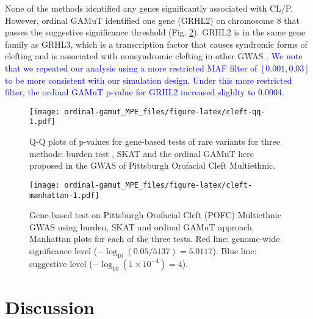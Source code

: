 \documentclass[]{article}
\begin{document}
None of the methods identified any genes significantly associated with CL/P. However, ordinal GAMuT
identified one gene (GRHL2) on chromosome 8 that passes the suggestive significance threshold (Fig. \ref{fig:cleft-manhattan}). GRHL2 is in the same gene family as GRHL3, which is a transcription factor that causes syndromic forms of clefting and is associated with nonsyndromic clefting in other GWAS \citep{Leslie2016, Leslie2016b, Carpinelli2017, PeyrardJanvid2014}. \textcolor{blue}{We note that we repeated our analysis using a more restricted MAF filter of $[0.001,0.03]$ to be more consistent with our simulation design. Under this more restricted filter, the ordinal GAMuT p-value for GRHL2 increased slighlty to 0.0004.}

\begin{figure}
\centering
\texttt{[image: ordinal-gamut\_MPE\_files/figure-latex/cleft-qq-1.pdf]}
\caption{\label{fig:cleft-qq}Q-Q plots of p-values for gene-based tests of rare variants for three methods: burden test \citep{Li2008, Madsen2009}, SKAT \citep{Wu2011} and the ordinal GAMuT here proposed in the GWAS of Pittsburgh Orofacial Cleft Multiethnic.}
\end{figure}

\begin{figure}
\centering
\texttt{[image: ordinal-gamut\_MPE\_files/figure-latex/cleft-manhattan-1.pdf]}
\caption{\label{fig:cleft-manhattan}Gene-based test on Pittsburgh Orofacial Cleft (POFC) Multiethnic GWAS using burden, SKAT and ordinal GAMuT approach. Manhattan plots for each of the three tests. Red line: genome-wide significance level (\(-\log_{10}(0.05/5137) = 5.0117\)). Blue line: suggestive level (\(-\log_{10}(1 \times 10 ^{-4}) = 4\)).}
\end{figure}

\hypertarget{discussion}{%
\section{Discussion}\label{discussion}}
\end{document}
